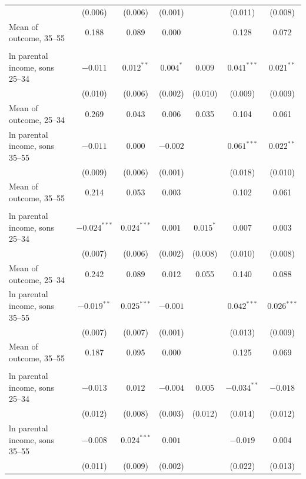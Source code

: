 \begin{table}[!htbp]
{{\begin{tabular}{lcccccc}
 & (0.006) & (0.006) & (0.001) &  & (0.011) & (0.008) \\
\quad Mean of outcome, 35--55 & 0.188 & 0.089 & 0.000 &  & 0.128 & 0.072 \\
\addlinespace
\multicolumn{7}{l}{\textit{Black}} \\
ln parental income, sons 25--34 & $-0.011$ & $0.012^{**}$ & $0.004^{*}$ & $0.009$ & $0.041^{***}$ & $0.021^{**}$ \\
 & (0.010) & (0.006) & (0.002) & (0.010) & (0.009) & (0.009) \\
\quad Mean of outcome, 25--34 & 0.269 & 0.043 & 0.006 & 0.035 & 0.104 & 0.061 \\
ln parental income, sons 35--55 & $-0.011$ & $0.000$ & $-0.002$ &  & $0.061^{***}$ & $0.022^{**}$ \\
 & (0.009) & (0.006) & (0.001) &  & (0.018) & (0.010) \\
\quad Mean of outcome, 35--55 & 0.214 & 0.053 & 0.003 &  & 0.102 & 0.061 \\
\addlinespace
\multicolumn{7}{l}{\textit{White}} \\
ln parental income, sons 25--34 & $-0.024^{***}$ & $0.024^{***}$ & $0.001$ & $0.015^{*}$ & $0.007$ & $0.003$ \\
 & (0.007) & (0.006) & (0.002) & (0.008) & (0.010) & (0.008) \\
\quad Mean of outcome, 25--34 & 0.242 & 0.089 & 0.012 & 0.055 & 0.140 & 0.088 \\
ln parental income, sons 35--55 & $-0.019^{**}$ & $0.025^{***}$ & $-0.001$ &  & $0.042^{***}$ & $0.026^{***}$ \\
 & (0.007) & (0.007) & (0.001) &  & (0.013) & (0.009) \\
\quad Mean of outcome, 35--55 & 0.187 & 0.095 & 0.000 &  & 0.125 & 0.069 \\
\addlinespace
\multicolumn{7}{l}{\textit{White $-$ Black}} \\
ln parental income, sons 25--34 & $-0.013$ & $0.012$ & $-0.004$ & $0.005$ & $-0.034^{**}$ & $-0.018$ \\
 & (0.012) & (0.008) & (0.003) & (0.012) & (0.014) & (0.012) \\
ln parental income, sons 35--55 & $-0.008$ & $0.024^{***}$ & $0.001$ &  & $-0.019$ & $0.004$ \\
 & (0.011) & (0.009) & (0.002) &  & (0.022) & (0.013) \\
\bottomrule
\end{tabular}}}
\par\smallskip

\end{table}

